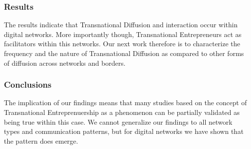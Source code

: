 \subsubsection{Results}
The results indicate that Transnational Diffusion and interaction
occur within digital networks. More importantly though, Transnational
Entrepreneurs act as facilitators within this networks. Our next work
therefore is to characterize the frequency and the nature of
Transnational Diffusion as compared to other forms of diffusion across
networks and borders.

\subsubsection{Conclusions}
The implication of our findings means that many studies based on the
concept of Transnational Entreprenuership as a phenomenon can be
partially validated as being true within this case. We cannot
generalize our findings to all network types and communication
patterns, but for digital networks we have shown that the pattern does
emerge.






